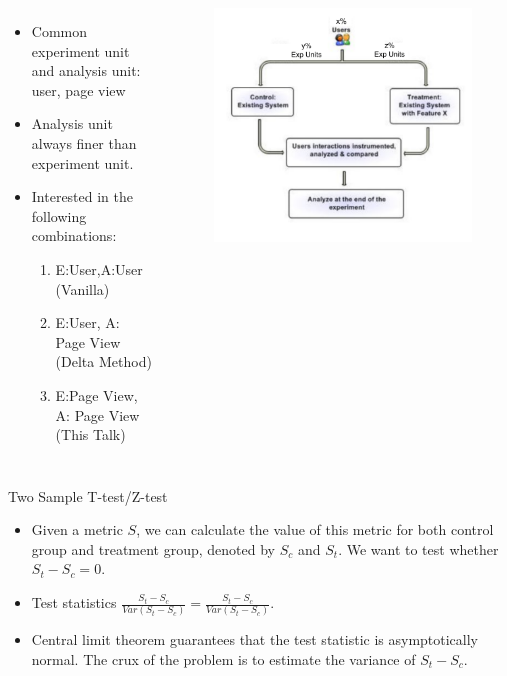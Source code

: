 \documentclass[xcolor=x11names,table]{beamer}
\newcommand{\var}{Var}
\begin{document}
\begin{frame}
\begin{columns}[t]
\column{2in}
\begin{itemize}
\item Common experiment unit and analysis unit: user, page view
\item Analysis unit always finer than experiment unit. 
\item Interested in the following combinations:
\begin{enumerate}
\item E:User,A:User (Vanilla) 
\item E:User, A: Page View (Delta Method)
\item E:Page View, A: Page View (This Talk)	
\end{enumerate}
\end{itemize}
\column{2in}
\begin{figure}[!htbp]
  \centering
  \includegraphics[width=1.2\textwidth]{split2}
\end{figure}
\end{columns}

\end{frame}

\begin{frame}{Two Sample T-test/Z-test}
\begin{itemize}
\item Given a metric $S$, we can calculate the value of this metric for both control group and treatment group, denoted by $S_c$ and $S_t$. We want to test whether $S_t-S_c=0$. 
\item Test statistics $\frac{S_t-S_c}{\var(S_t-S_c)} =\frac{S_t-S_c}{\var (S_t-S_c)}$. 
\item Central limit theorem guarantees that the test statistic is asymptotically normal. The crux of the problem is to estimate the variance of $S_t-S_c$.
\end{itemize}
\end{frame}
\end{document}
